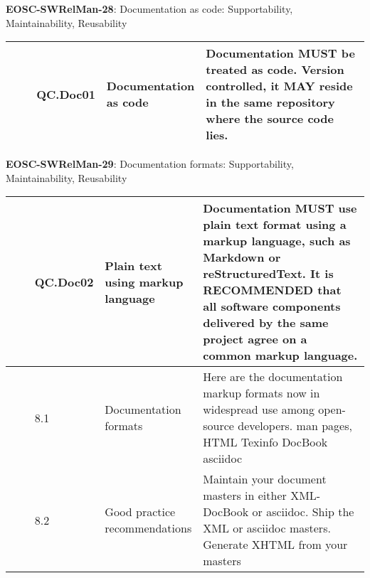\textbf{EOSC-SWRelMan-28}: Documentation as code: Supportability, Maintainability, Reusability
\nopagebreak[4]
\begin{center}
    \tabletail{\hline}
    \tiny
    \begin{supertabular}{|p{0.10\linewidth}|p{0.10\linewidth}|p{0.20\linewidth}|p{0.60\linewidth}|} \hline
        \cite{orviz_set_2017} & QC.Doc01 & Documentation as code & Documentation MUST be treated as code. Version controlled, it MAY reside in the same repository where the source code lies.\\ \hline
    \end{supertabular}
\end{center}

\textbf{EOSC-SWRelMan-29}: Documentation formats: Supportability, Maintainability, Reusability
\nopagebreak[4]
\begin{center}
    \tabletail{\hline}
    \tiny
    \begin{supertabular}{|p{0.10\linewidth}|p{0.10\linewidth}|p{0.20\linewidth}|p{0.60\linewidth}|} \hline
        \cite{orviz_set_2017} & QC.Doc02 & Plain text using markup language & Documentation MUST use plain text format using a markup language, such as Markdown or reStructuredText. It is RECOMMENDED that all software components delivered by the same project agree on a common markup language.\\ \hline
        \cite{raymond_software_2013} & 8.1 & Documentation formats & Here are the documentation markup formats now in widespread use among open-source developers. man pages, HTML Texinfo DocBook asciidoc\\ \hline
        \cite{raymond_software_2013} & 8.2 & Good practice recommendations & Maintain your document masters in either XML-DocBook or asciidoc. Ship the XML or asciidoc masters. Generate XHTML from your masters\\ \hline
    \end{supertabular}
\end{center}

